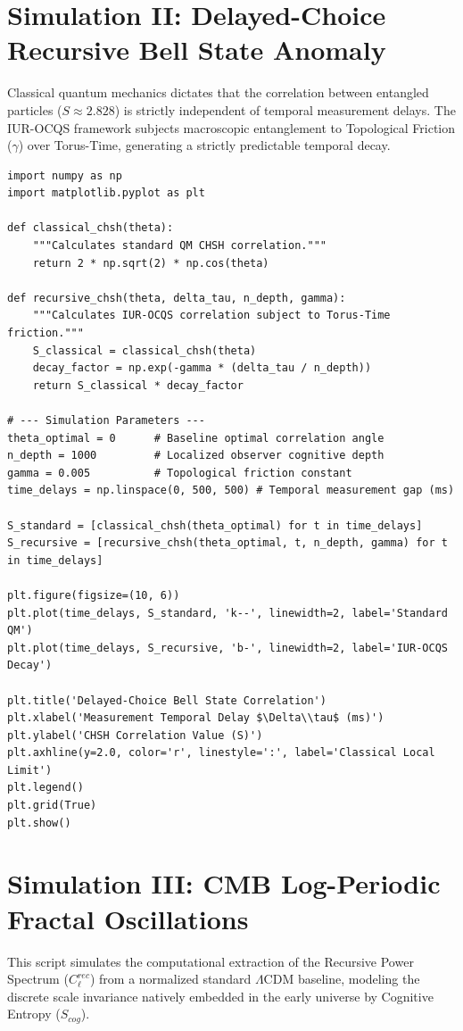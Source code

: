 \documentclass[12pt,openany]{book}
\begin{document}
\section{Simulation II: Delayed-Choice Recursive Bell State Anomaly}
Classical quantum mechanics dictates that the correlation between entangled particles ($S \approx 2.828$) is strictly independent of temporal measurement delays. The IUR-OCQS framework subjects macroscopic entanglement to Topological Friction ($\gamma$) over Torus-Time, generating a strictly predictable temporal decay.

\begin{verbatim}
import numpy as np
import matplotlib.pyplot as plt

def classical_chsh(theta):
    """Calculates standard QM CHSH correlation."""
    return 2 * np.sqrt(2) * np.cos(theta)

def recursive_chsh(theta, delta_tau, n_depth, gamma):
    """Calculates IUR-OCQS correlation subject to Torus-Time friction."""
    S_classical = classical_chsh(theta)
    decay_factor = np.exp(-gamma * (delta_tau / n_depth))
    return S_classical * decay_factor

# --- Simulation Parameters ---
theta_optimal = 0      # Baseline optimal correlation angle
n_depth = 1000         # Localized observer cognitive depth
gamma = 0.005          # Topological friction constant
time_delays = np.linspace(0, 500, 500) # Temporal measurement gap (ms)

S_standard = [classical_chsh(theta_optimal) for t in time_delays]
S_recursive = [recursive_chsh(theta_optimal, t, n_depth, gamma) for t in time_delays]

plt.figure(figsize=(10, 6))
plt.plot(time_delays, S_standard, 'k--', linewidth=2, label='Standard QM')
plt.plot(time_delays, S_recursive, 'b-', linewidth=2, label='IUR-OCQS Decay')

plt.title('Delayed-Choice Bell State Correlation')
plt.xlabel('Measurement Temporal Delay $\Delta\\tau$ (ms)')
plt.ylabel('CHSH Correlation Value (S)')
plt.axhline(y=2.0, color='r', linestyle=':', label='Classical Local Limit')
plt.legend()
plt.grid(True)
plt.show()
\end{verbatim}

\section{Simulation III: CMB Log-Periodic Fractal Oscillations}
This script simulates the computational extraction of the Recursive Power Spectrum ($C_\ell^{rec}$) from a normalized standard $\Lambda$CDM baseline, modeling the discrete scale invariance natively embedded in the early universe by Cognitive Entropy ($S_{cog}$).
\end{document}
